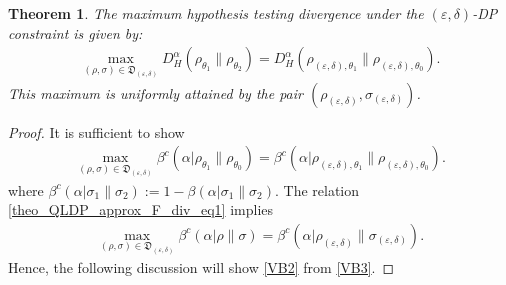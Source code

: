 \documentclass[10pt,a4paper]{amsart}
\newtheorem{theorem}{Theorem}
\newcommand{\eps}{\varepsilon}
\begin{document}
\begin{theorem}\label{THJ}
The maximum hypothesis testing divergence under the $(\eps,\delta)$-DP constraint is given by:
\begin{align}
\max_{(\rho,\sigma) \in \mathfrak{D}_{(\eps,\delta)}} D_H^\alpha( \rho_{\theta_1}\|\rho_{\theta_2}) 
= D_H^\alpha( \rho_{(\eps,\delta),\theta_1}\|\rho_{(\eps,\delta),\theta_0}).
\end{align}
This maximum is uniformly attained by the pair $(\rho_{(\eps,\delta)}, \sigma_{(\eps,\delta)})$.
\end{theorem}

\begin{proof}
It is sufficient to show
\begin{align}
\max_{(\rho,\sigma) \in \mathfrak{D}_{(\eps,\delta)}} 
\beta^c(\alpha|\rho_{\theta_1}\|\rho_{\theta_0}) 
= \beta^c(\alpha| \rho_{(\eps,\delta),\theta_1}\|\rho_{(\eps,\delta),\theta_0})\label{VB2}.
\end{align}
where $\beta^c(\alpha| \sigma_1\|\sigma_2) :=1-\beta(\alpha| \sigma_1\|\sigma_2) $.
The relation \eqref{theo_QLDP_approx_F_div_eq1} implies
\begin{align}
\max_{(\rho,\sigma) \in \mathfrak{D}_{(\eps,\delta)}} 
\beta^c(\alpha| \rho\|\sigma) 
= \beta^c(\alpha| \rho_{(\eps,\delta)}\|\sigma_{(\eps,\delta)})
\label{VB3}.
\end{align}
Hence, the following discussion will show \eqref{VB2} from \eqref{VB3}.


\end{proof}
\end{document}
